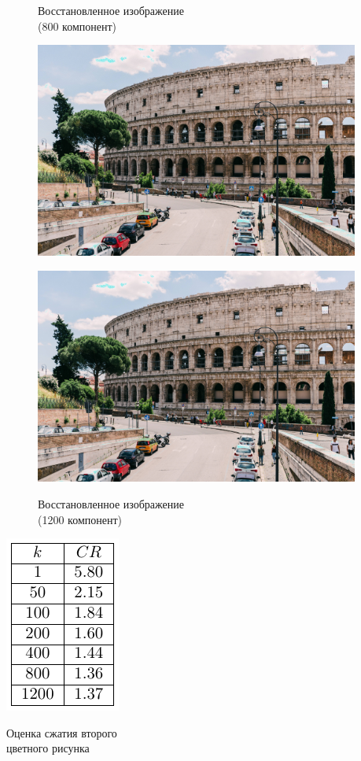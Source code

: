 \documentclass[a4paper]{article}
\begin{document}
\begin{figure}[H]
\centering
    \begin{minipage}{.45\textwidth}
    \caption{Восстановленное изображение \\(800 компонент)}
    \includegraphics[width = 0.95\textwidth]{reconstructions/with_800comps_Colosseum.jpg}
    \label{fig:col_800}
    \end{minipage}%
    \begin{minipage}{.45\textwidth}
      \centering
    \caption{Восстановленное изображение \\(1200 компонент)}
    \includegraphics[width = 0.95\textwidth]{reconstructions/with_1200comps_Colosseum.jpg}
    \label{fig:col_1200}
    \end{minipage}%
\end{figure}
\begin{table}[H]
    \centering
    \includegraphics[]{tables/CR_for_Colosseum.pdf}
    \caption{Оценка сжатия второго\\цветного рисунка}
    \label{tab:col}
\end{table}
\end{document}
